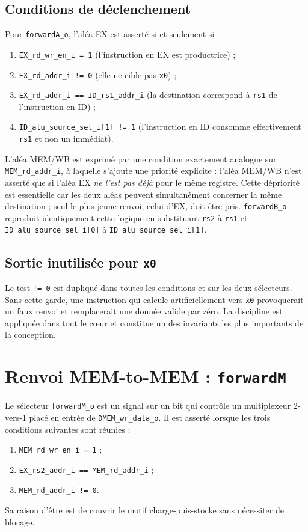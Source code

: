 \documentclass[11pt,a4paper,oneside]{report}
\begin{document}
\subsection{Conditions de déclenchement}
Pour \texttt{forwardA\_o}, l'aléa EX est asserté si et seulement
si :
\begin{enumerate}
  \item \texttt{EX\_rd\_wr\_en\_i = 1} (l'instruction en EX est
        productrice) ;
  \item \texttt{EX\_rd\_addr\_i != 0} (elle ne cible pas
        \texttt{x0}) ;
  \item \texttt{EX\_rd\_addr\_i == ID\_rs1\_addr\_i} (la
        destination correspond à \texttt{rs1} de l'instruction en
        ID) ;
  \item \texttt{ID\_alu\_source\_sel\_i[1] != 1} (l'instruction
        en ID consomme effectivement \texttt{rs1} et non un
        immédiat).
\end{enumerate}
L'aléa MEM/WB est exprimé par une condition exactement analogue
sur \texttt{MEM\_rd\_addr\_i}, à laquelle s'ajoute une priorité
explicite : l'aléa MEM/WB n'est asserté que si l'aléa EX
\emph{ne l'est pas déjà} pour le même registre. Cette dépriorité
est essentielle car les deux aléas peuvent simultanément concerner
la même destination ; seul le \og{}plus jeune\fg{} renvoi, celui
d'EX, doit être pris.
\texttt{forwardB\_o} reproduit identiquement cette logique en
substituant \texttt{rs2} à \texttt{rs1} et
\texttt{ID\_alu\_source\_sel\_i[0]} à
\texttt{ID\_alu\_source\_sel\_i[1]}.

\subsection{Sortie inutilisée pour \texttt{x0}}
Le test \texttt{!= 0} est dupliqué dans toutes les conditions et
sur les deux sélecteurs. Sans cette garde, une instruction qui
calcule artificiellement vers \texttt{x0} provoquerait un faux
renvoi et remplacerait une donnée valide par zéro. La discipline
est appliquée dans tout le c\oe{}ur et constitue un des invariants
les plus importants de la conception.

\section{Renvoi MEM-to-MEM : \texttt{forwardM}}
Le sélecteur \texttt{forwardM\_o} est un signal sur un bit qui
contrôle un multiplexeur 2-vers-1 placé en entrée de
\texttt{DMEM\_wr\_data\_o}. Il est asserté lorsque les trois
conditions suivantes sont réunies :
\begin{enumerate}
  \item \texttt{MEM\_rd\_wr\_en\_i = 1} ;
  \item \texttt{EX\_rs2\_addr\_i == MEM\_rd\_addr\_i} ;
  \item \texttt{MEM\_rd\_addr\_i != 0}.
\end{enumerate}
Sa raison d'être est de couvrir le motif \og{}charge-puis-stocke\fg{}
sans nécessiter de blocage.
\end{document}
